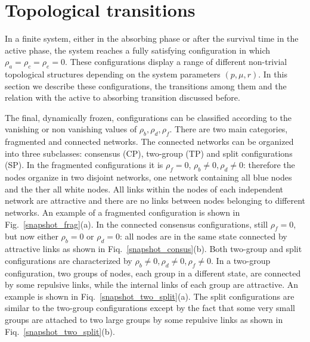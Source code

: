 \documentclass[aps,pre,notitlepage]{revtex4-1}
\begin{document}
\section*{Topological transitions}

In a finite system, either in the absorbing phase or after the survival time in the active phase, the system reaches a fully satisfying configuration in which $\rho_a=\rho_c=\rho_e=0$. These configurations display a range of different non-trivial topological structures depending on the system parameters $(p,\mu,r)$. In this section we describe these configurations, the transitions among them and the relation with the active to absorbing transition discussed before.

The final, dynamically frozen, configurations can be classified according to the vanishing or non vanishing values of $\rho_b,\rho_d,\rho_f$. There are two main categories, fragmented and connected networks. The connected networks can be organized into three subclasses: consensus (CP), two-group (TP) and split configurations (SP). In the fragmented configurations it is $\rho_f=0$, $\rho_b\neq 0,\rho_d\neq 0$: therefore the nodes organize in two disjoint networks, one network containing all blue nodes and the ther all white nodes.  All links within the nodes of each independent network are attractive and there are no links between nodes belonging to different networks. An example of a fragmented configuration is shown in Fig.~\ref{snapshot_frag}(a). In the connected  consensus configurations, still $\rho_f=0$, but now either $\rho_b= 0$ or $\rho_d= 0$: all nodes are in the same state connected by attractive links as shown in Fiq.~\ref{snapshot_consus}(b). Both two-group and split configurations are characterized by $\rho_b\neq 0,\rho_d\neq 0,\rho_f\neq 0 $. In a two-group configuration, two groups of nodes, each group in a different state, are connected by some repulsive links, while the internal links of each group are attractive. An example is shown in Fiq.~\ref{snapshot_two_split}(a). The split configurations are similar to the two-group configurations except by the fact that some very small groups are attached to two large groups by some repulsive links as shown in Fiq.~\ref{snapshot_two_split}(b). 
\end{document}
